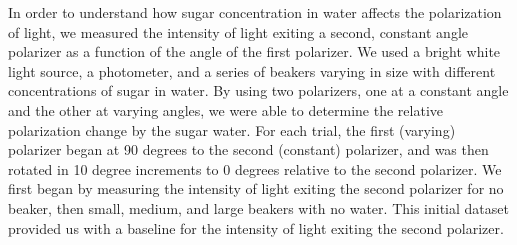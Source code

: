 


In order to understand how sugar concentration in water affects the polarization of light, we measured the intensity of light exiting a second, 
constant angle polarizer as a function of the angle of the first polarizer. We used a bright white light source, a photometer, 
and a series of beakers varying in size with different concentrations of sugar in water. By using two polarizers, one at a constant angle and the other at varying angles, we were able to determine
the relative polarization change by the sugar water. For each trial, the first (varying) polarizer began at 90 degrees to the second (constant) polarizer, 
and was then rotated in 10 degree increments to 0 degrees relative to the second polarizer. We first began by measuring the intensity of light exiting the second polarizer for no beaker, 
then small, medium, and large beakers with no water. This initial dataset provided us with a baseline for the intensity of light exiting the second polarizer.